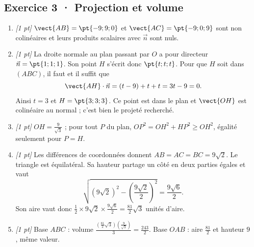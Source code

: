 \subsection*{Exercice 3 · Projection et volume}\begin{enumerate}

\item \textit{[1 pt]} $\vect{AB}=\pt{-9;9;0}$ et $\vect{AC}=\pt{-9;0;9}$ sont non colinéaires et leurs produits scalaires avec $\vec n$ sont nuls.

\item \textit{[1 pt]} La droite normale au plan passant par $O$ a pour directeur $\vec n=\pt{1;1;1}$. Son point $H$ s'écrit donc $\pt{t;t;t}$. Pour que $H$ soit dans $(ABC)$, il faut et il suffit que
\[\vect{AH}\cdot\vec n=(t-9)+t+t=3t-9=0.\]
Ainsi $t=3$ et $H=\pt{3;3;3}$. Ce point est dans le plan et $\vect{OH}$ est colinéaire au normal ; c'est bien le projeté recherché.

\item \textit{[1 pt]} $OH=\frac{9}{\sqrt{3}}$ ; pour tout $P$ du plan, $OP^2=OH^2+HP^2\ge OH^2$, égalité seulement pour $P=H$.

\item \textit{[1 pt]} Les différences de coordonnées donnent $AB=AC=BC=9\sqrt2$. Le triangle est équilatéral. Sa hauteur partage un côté en deux parties égales et vaut
\[\sqrt{(9\sqrt2)^2-(\frac{9\sqrt{2}}{2})^2}=\frac{9\sqrt6}{2}.\]
Son aire vaut donc $\frac12\times 9\sqrt2\times\frac{9\sqrt6}{2}=\frac{81}{2}\sqrt3$ unités d'aire.

\item \textit{[1 pt]} Base $ABC$ : volume $\frac{(\frac{81}{2}\sqrt3)(\frac{9}{\sqrt{3}})}{3}=\frac{243}{2}$. Base $OAB$ : aire $\frac{81}{2}$ et hauteur $9$, même valeur.

\end{enumerate}

